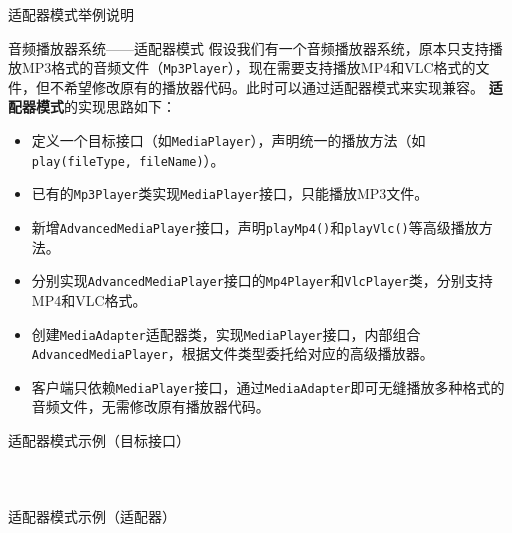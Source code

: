\documentclass[UTF8,aspectratio=169]{beamer}
\begin{document}
\begin{frame}{适配器模式举例说明}
    \begin{exampleytublock}{音频播放器系统——适配器模式}
        假设我们有一个音频播放器系统，原本只支持播放MP3格式的音频文件（\texttt{Mp3Player}），现在需要支持播放MP4和VLC格式的文件，但不希望修改原有的播放器代码。此时可以通过适配器模式来实现兼容。
        \textbf{适配器模式}的实现思路如下：
        \begin{itemize}
            \item 定义一个目标接口（如\texttt{MediaPlayer}），声明统一的播放方法（如\texttt{play(fileType, fileName)}）。
            \item 已有的\texttt{Mp3Player}类实现\texttt{MediaPlayer}接口，只能播放MP3文件。
            \item 新增\texttt{AdvancedMediaPlayer}接口，声明\texttt{playMp4()}和\texttt{playVlc()}等高级播放方法。
            \item 分别实现\texttt{AdvancedMediaPlayer}接口的\texttt{Mp4Player}和\texttt{VlcPlayer}类，分别支持MP4和VLC格式。
            \item 创建\texttt{MediaAdapter}适配器类，实现\texttt{MediaPlayer}接口，内部组合\texttt{AdvancedMediaPlayer}，根据文件类型委托给对应的高级播放器。
            \item 客户端只依赖\texttt{MediaPlayer}接口，通过\texttt{MediaAdapter}即可无缝播放多种格式的音频文件，无需修改原有播放器代码。
        \end{itemize}
    \end{exampleytublock}
\end{frame}

\begin{frame}{适配器模式示例（目标接口）}
    \begin{columns}
        \begin{column}{0.48\textwidth}
            \inputminted[firstline=7, lastline=24]{cpp}{code/adapter_pattern.cpp}
        \end{column}
        \begin{column}{0.48\textwidth}
            \inputminted[firstline=25, lastline=42]{cpp}{code/adapter_pattern.cpp}
        \end{column}
    \end{columns}
\end{frame}

\begin{frame}{适配器模式示例（适配器）}
    \begin{columns}
        \begin{column}{0.48\textwidth}
            \inputminted[firstline=44, lastline=61]{cpp}{code/adapter_pattern.cpp}
        \end{column}
        \begin{column}{0.48\textwidth}
            \inputminted[firstline=62, lastline=75]{cpp}{code/adapter_pattern.cpp}
        \end{column}
    \end{columns}
\end{frame}
\end{document}
